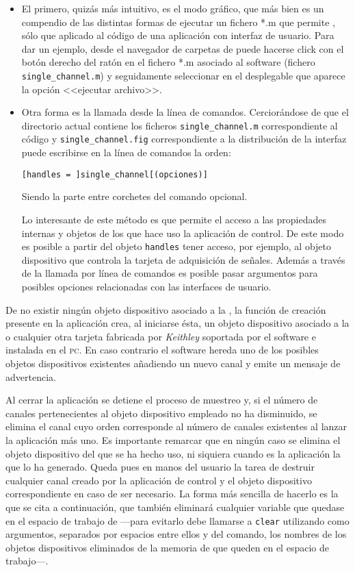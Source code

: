 \begin{itemize}
	\item El primero, quizás más intuitivo, es el modo gráfico, que más bien es un compendio de las distintas formas de ejecutar un fichero *.m que permite \matlab{}, sólo que aplicado al código de una aplicación con interfaz de usuario. Para dar un ejemplo, desde el navegador de carpetas de \matlab{} puede hacerse click con el botón derecho del ratón en el fichero *.m asociado al software (fichero \texttt{single\_channel.m}) y seguidamente seleccionar en el desplegable que aparece la opción <<ejecutar archivo>>.
	\item Otra forma es la llamada desde la línea de comandos. Cerciorándose de que el directorio actual contiene los ficheros \texttt{single\_channel.m} correspondiente al código y \texttt{single\_channel.fig} correspondiente a la distribución de la interfaz puede escribirse en la línea de comandos la orden:

		\begin{lstlisting}[gobble=16]
			[handles = ]single_channel[(opciones)]
		\end{lstlisting}

	Siendo la parte entre corchetes del comando opcional.\par Lo interesante de este método es que permite el acceso a las propiedades internas y objetos de los que hace uso la aplicación de control. De este modo es posible a partir del objeto \texttt{handles} tener acceso, por ejemplo, al objeto dispositivo que controla la tarjeta de adquisición de señales. Además a través de la llamada por línea de comandos es posible pasar argumentos para posibles opciones relacionadas con las interfaces de usuario.
\end{itemize}

De no existir ningún objeto dispositivo asociado a la \kpci{}, la función de creación presente en la aplicación crea, al iniciarse ésta, un objeto dispositivo asociado a la \kpci{} o cualquier otra tarjeta fabricada por \emph{Keithley} soportada por el software e instalada en el \textsc{pc}. En caso contrario el software hereda uno de los posibles objetos dispositivos existentes añadiendo un nuevo canal y emite un mensaje de advertencia.\par
Al cerrar la aplicación se detiene el proceso de muestreo y, si el número de canales pertenecientes al objeto dispositivo empleado no ha disminuido, se elimina el canal cuyo orden corresponde al número de canales existentes al lanzar la aplicación más uno. Es importante remarcar que en ningún caso se elimina el objeto dispositivo del que se ha hecho uso, ni siquiera cuando es la aplicación la que lo ha generado. Queda pues en manos del usuario la tarea de destruir cualquier canal creado por la aplicación de control y el objeto dispositivo correspondiente en caso de ser necesario. La forma más sencilla de hacerlo es la que se cita a continuación, que también eliminará cualquier variable que quedase en el espacio de trabajo de \matlab{} ---para evitarlo debe llamarse a \texttt{clear} utilizando como argumentos, separados por espacios entre ellos y del comando, los nombres de los objetos dispositivos eliminados de la memoria de \matlab{} que queden en el espacio de trabajo---.

